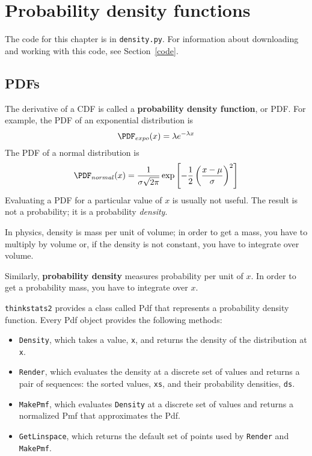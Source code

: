 \documentclass[12pt]{book}
\begin{document}
\chapter{Probability density functions}
\label{density}

The code for this chapter is in {\tt density.py}.  For information
about downloading and working with this code, see Section~\ref{code}.


\section{PDFs}

The derivative of a CDF is called a {\bf probability density function},
or PDF.  For example, the PDF of an exponential distribution is
%
\[ \PDF_{expo}(x) = \lambda e^{-\lambda x}   \]
%
The PDF of a normal distribution is
%
\[ \PDF_{normal}(x) = \frac{1}{\sigma \sqrt{2 \pi}} 
                 \exp \left[ -\frac{1}{2} 
                 \left( \frac{x - \mu}{\sigma} \right)^2 \right]  \]
%
Evaluating a PDF for a particular value of $x$ is usually not useful.
The result is not a probability; it is a probability {\em density}.

In physics, density is mass per unit of
volume; in order to get a mass, you have to multiply by volume or,
if the density is not constant, you have to integrate over volume.

Similarly, {\bf probability density} measures probability per unit of $x$.
In order to get a probability mass, you have to integrate over $x$.

{\tt thinkstats2} provides a class called Pdf that represents
a probability density function.  Every Pdf object provides the
following methods:

\begin{itemize}

\item {\tt Density}, which takes a value, {\tt x}, and returns the
  density of the distribution at {\tt x}.

\item {\tt Render}, which evaluates the density at a discrete set of
  values and returns a pair of sequences: the sorted values, {\tt xs},
  and their probability densities, {\tt ds}.

\item {\tt MakePmf}, which evaluates {\tt Density}
  at a discrete set of values and returns a normalized Pmf that
  approximates the Pdf.

\item {\tt GetLinspace}, which returns the default set of points used 
  by {\tt Render} and {\tt MakePmf}.

\end{itemize}  
\end{document}
